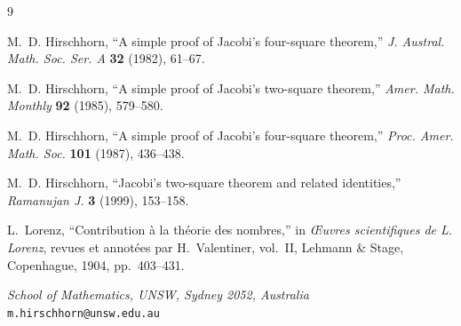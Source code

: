 \documentclass[10pt]{article}
\begin{document}
\begin{thebibliography}{9}

M.~D. Hirschhorn,
``A simple proof of Jacobi's four-square theorem,''
\emph{J. Austral. Math. Soc. Ser. A} \textbf{32} (1982), 61--67.

M.~D. Hirschhorn,
``A simple proof of Jacobi's two-square theorem,''
\emph{Amer. Math. Monthly} \textbf{92} (1985), 579--580.

M.~D. Hirschhorn,
``A simple proof of Jacobi's four-square theorem,''
\emph{Proc. Amer. Math. Soc.} \textbf{101} (1987), 436--438.

M.~D. Hirschhorn,
``Jacobi's two-square theorem and related identities,''
\emph{Ramanujan J.} \textbf{3} (1999), 153--158.

L.~Lorenz,
``Contribution à la théorie des nombres,''
in \emph{\OE uvres scientifiques de L. Lorenz},
revues et annotées par H.~Valentiner, vol.~II,
Lehmann \& Stage, Copenhague, 1904, pp.~403--431.

\end{thebibliography}

\bigskip
\noindent\textit{School of Mathematics, UNSW, Sydney 2052, Australia}\\
\texttt{m.hirschhorn@unsw.edu.au}
\end{document}
